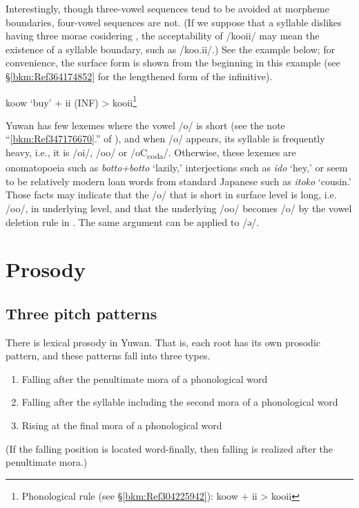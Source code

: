 Interestingly, though three-vowel sequences tend to be avoided at morpheme boundaries, four-vowel sequences are not. (If we suppose that a syllable dislikes having three morae cosidering , the acceptability of /kooii/ may mean the existence of a syllable boundary, such as /koo.ii/.) See the example below; for convenience, the surface form is shown from the beginning in this example (see §\ref{bkm:Ref364174852} for the lengthened form of the infinitive).

\ea koow  ‘buy’  +  ii  (INF)  >  kooii\footnote{Phonological rule (see §\ref{bkm:Ref304225942}): koow + ii > kooii} \z

Yuwan has few lexemes where the vowel /o/ is short (see the note “\ref{bkm:Ref347176670}.” of ), and when /o/ appears, its syllable is frequently heavy, i.e., it is /oi/, /oo/ or /oC\textsubscript{coda}/. Otherwise, these lexemes are onomatopoeia such as \textit{botto+botto} ‘lazily,’ interjections such as \textit{ido} ‘hey,’ or seem to be relatively modern loan words from standard Japanese such as \textit{itoko} ‘cousin.’ Those facts may indicate that the /o/ that is short in surface level is long, i.e. /oo/, in underlying level, and that the underlying /oo/ becomes /o/ by the vowel deletion rule in . The same argument can be applied to /ə/.

\section{Prosody}\label{bkm:Ref301560567}\hypertarget{RefHeadingToc395696983}{}
\subsection{Three pitch patterns}\label{bkm:Ref303982713}\hypertarget{RefHeadingToc395696984}{}

There is lexical prosody in Yuwan. That is, each root has its own prosodic pattern, and these patterns fall into three types.

\begin{enumerate}[label=\Roman*.]
\item Falling after the penultimate mora of a phonological word
\item Falling after the syllable including the second mora of a phonological word
\item Rising at the final mora of a phonological word
\end{enumerate}

(If the falling position is located word-finally, then falling is realized after the penultimate mora.)

